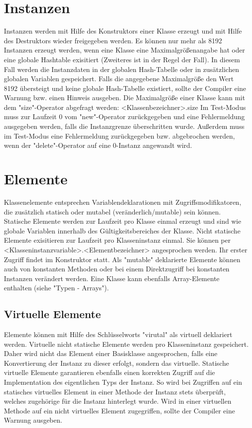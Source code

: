 \section{Instanzen}
Instanzen werden mit Hilfe des Konstruktors einer Klasse erzeugt und mit Hilfe des Destruktors wieder freigegeben werden.
Es können nur mehr als 8192 Instanzen erzeugt werden, wenn eine Klasse eine Maximalgrößenangabe hat oder eine globale Hashtable exisitiert (Zweiteres ist in der Regel der Fall).
In diesem Fall werden die Instanzdaten in der globalen Hash-Tabelle oder in zusätzlichen globalen Variablen gespeichert.
Falls die angegebene Maximalgröße den Wert 8192 übersteigt und keine globale Hash-Tabelle existiert,
sollte der Compiler eine Warnung bzw. einen Hinweis ausgeben.
Die Maximalgröße einer Klasse kann mit dem "size"-Operator abgefragt werden: <Klassenbezeichner>.size
Im Test-Modus muss zur Laufzeit 0 vom "new"-Operator zurückgegeben und eine Fehlermeldung ausgegeben werden, falls die Instanzgrenze
überschritten wurde.
Außerdem muss im Test-Modus eine Fehlermeldung zurückgegeben bzw. abgebrochen werden, wenn der "delete"-Operator auf eine 0-Instanz angewandt wird.

\section{Elemente}
Klassenelemente entsprechen Variablendeklarationen mit Zugriffsmodifikatoren, die zusätzlich statisch oder mutabel (veränderlich/mutable) sein können.
Statische Elemente werden zur Laufzeit pro Klasse einmal erzeugt und sind wie globale Variablen innerhalb des Gültigkeitsbereiches der Klasse.
Nicht statische Elemente exisitieren zur Laufzeit pro Klasseninstanz einmal.
Sie können per <Klasseninstanzvariable>.<Elementbezeichner> angesprochen werden.
Ihr erster Zugriff findet im Konstruktor statt.
Als "mutable" deklarierte Elemente können auch von konstanten Methoden oder bei einem Direktzugriff bei konstanten Instanzen verändert werden.
Eine Klasse kann ebenfalls Array-Elemente enthalten (siehe "Typen - Arrays").

\subsection{Virtuelle Elemente}
Elemente können mit Hilfe des Schlüsselworts "virutal" als virtuell deklariert werden. Virtuelle nicht statische Elemente werden pro
Klasseninstanz gespeichert. Daher wird nicht das Element einer Basisklasse angesprochen, falls eine Konvertierung der Instanz zu
dieser erfolgt, sondern das virtuelle.
Statische virtuelle Elemente garantieren ebenfalls einen korrekten Zugriff auf die Implementation des eigentlichen Typs der Instanz.
So wird bei Zugriffen auf ein statisches virtuelles Element in einer Methode der Instanz stets überprüft, welches zugehörige für die
Instanz hinterlegt wurde.
Wird in einer virtuellen Methode auf ein nicht virtuelles Element zugegriffen, sollte der Compiler eine Warnung ausgeben.

